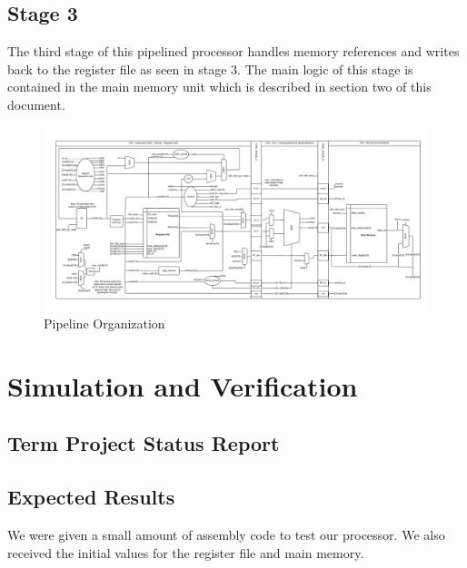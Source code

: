 	
    \subsection{Stage 3}
    The third stage of this pipelined processor handles memory references and writes back to the
    register file as seen in stage 3. The main logic of this stage is contained in the 
    main memory unit which is described in section two of this document.
    \FloatBarrier
    \newpage  
    \begin{figure}[htpb]
        \centering
        \includegraphics[angle=90,width=.68\textwidth]{./figures/142.pdf}
        \caption{Pipeline Organization}
        \label{fullschematic}
    \end{figure}
    \FloatBarrier


   

	\section{Simulation and Verification}
	\subsection{Term Project Status Report}
	\onecolumn
	
    
    
	\twocolumn
	\subsection{Expected Results}
	We were given a small amount of assembly code to test our processor. We also
	received the initial values for the register file and main memory. 
	
	
